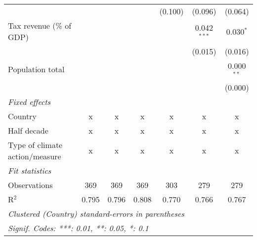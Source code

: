 \begin{tabular}{lcccccc}
                                                             &         &         &                & (0.100)        & (0.096)        & (0.064)\\   
   Tax revenue (\% of GDP)                                   &         &         &                &                & 0.042$^{***}$  & 0.030$^{*}$\\   
                                                             &         &         &                &                & (0.015)        & (0.016)\\   
   Population total                                          &         &         &                &                &                & 0.000$^{**}$\\   
                                                             &         &         &                &                &                & (0.000)\\   
   \emph{Fixed effects}\\
   Country                                                   & x       & x       & x              & x              & x              & x\\  
   Half decade                                               & x       & x       & x              & x              & x              & x\\  
   Type of climate action/measure                            & x       & x       & x              & x              & x              & x\\  
   \midrule \emph{Fit statistics}\\
   Observations                                              & 369     & 369     & 369            & 303            & 279            & 279\\  
   R$^2$                                                     & 0.795   & 0.796   & 0.808          & 0.770          & 0.766          & 0.767\\  
   \midrule
   \multicolumn{7}{l}{\emph{Clustered (Country) standard-errors in parentheses}}\\
   \multicolumn{7}{l}{\emph{Signif. Codes: ***: 0.01, **: 0.05, *: 0.1}}\\
\end{tabular}
\par\endgroup


